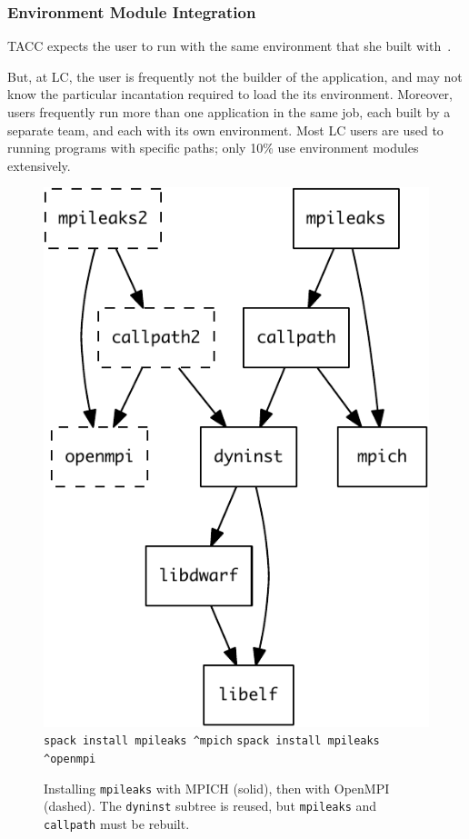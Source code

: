 \subsubsection{Environment Module Integration}

TACC expects the user to run with the same
environment that she built with~\cite{mclay:lmod-tutorial}.  


But, at LC, the user is
frequently not the builder of the application, and may not know the particular
incantation required to load the its environment. Moreover, users frequently run more 
than one application in the same job, each built by a separate team, and each with
its own environment. Most LC users are used to running programs with
specific paths; only 10\% use environment modules extensively.

\begin{figure}\centering
	\includegraphics[width=.6\linewidth]{specs/rpaths.pdf}
	\newline
	\verb|spack install mpileaks ^mpich|\newline
	\verb|spack install mpileaks ^openmpi|
	\caption{
		Installing {\tt mpileaks} with MPICH (solid), then with OpenMPI (dashed).  The {\tt dyninst} subtree is
		reused, but {\tt mpileaks} and {\tt callpath} must be rebuilt.
	}
\end{figure}





